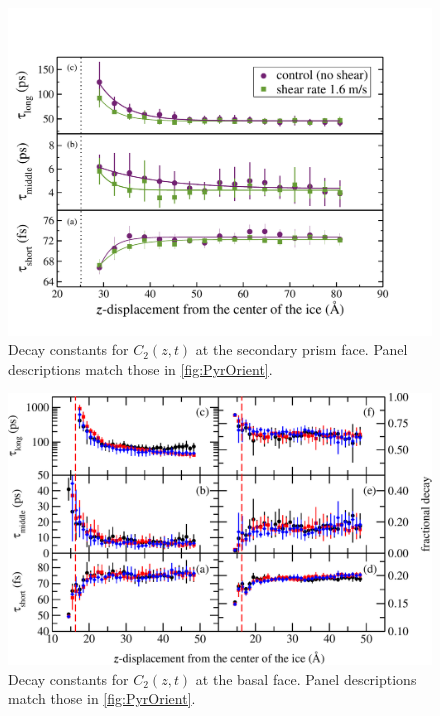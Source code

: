 \documentclass[aps,jcp,preprint,showpacs,superscriptaddress,groupedaddress]{revtex4}  %
\begin{document}
\newpage
\begin{figure}
\includegraphics[width=\linewidth]{SP-orient}
\caption{\label{fig:SPorient} Decay constants for $C_2(z,t)$ at the secondary prism face. Panel descriptions match those in \ref{fig:PyrOrient}.}
\end{figure}

\newpage
\begin{figure}
\includegraphics[width=\linewidth]{basal_lcorrz}
\caption{\label{fig:Borient} Decay constants for $C_2(z,t)$ at the basal face. Panel descriptions match those in \ref{fig:PyrOrient}.}
\end{figure}
\end{document}
